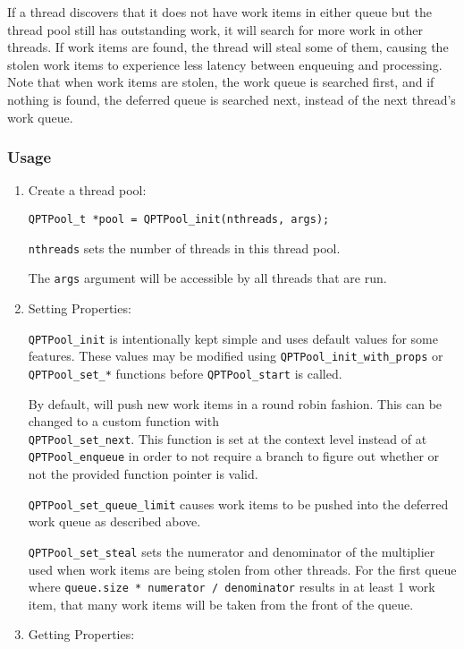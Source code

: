 If a thread discovers that it does not have work items in either queue
but the thread pool still has outstanding work, it will search for
more work in other threads. If work items are found, the thread will
steal some of them, causing the stolen work items to experience less
latency between enqueuing and processing. Note that when work items
are stolen, the work queue is searched first, and if nothing is found,
the deferred queue is searched next, instead of the next thread's work
queue.

\subsubsection{Usage}
\begin{enumerate}
\item Create a thread pool:

  \texttt{QPTPool\_t *pool = QPTPool\_init(nthreads, args);}

  \texttt{nthreads} sets the number of threads in this thread
  pool.

  The \texttt{args} argument will be accessible by all threads that
  are run.

\item Setting Properties:

  \texttt{QPTPool\_init} is intentionally kept simple and uses default
  values for some features. These values may be modified using
  \texttt{QPTPool\_init\_with\_props} or \texttt{QPTPool\_set\_*}
  functions before \texttt{QPTPool\_start} is called.

  By default, \qptp will push new work items in a round robin
  fashion. This can be changed to a custom function with
  \\\texttt{QPTPool\_set\_next}. This function is set at the context
  level instead of at \texttt{QPTPool\_enqueue} in order to not
  require a branch to figure out whether or not the provided function
  pointer is valid.

  \texttt{QPTPool\_set\_queue\_limit} causes work items to be pushed
  into the deferred work queue as described above.

  \texttt{QPTPool\_set\_steal} sets the numerator and denominator of
  the multiplier used when work items are being stolen from other
  threads. For the first queue where \texttt{queue.size * numerator /
  denominator} results in at least 1 work item, that many work items
  will be taken from the front of the queue.

\item Getting Properties:


\end{enumerate}
